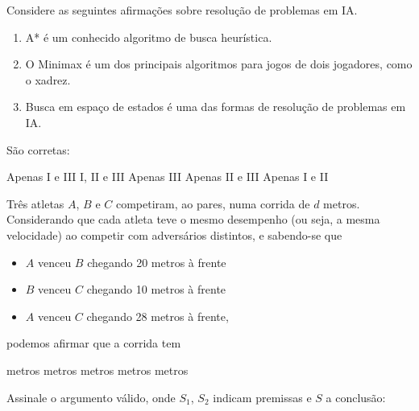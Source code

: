 \documentclass[12pt, addpoints]{exam}
\begin{document}
\begin{questions}
\question

Considere as seguintes afirmações sobre resolução de problemas em IA.

\begin{enumerate}[label=\Roman*.]

    \item A* é um conhecido algoritmo de busca heurística.

    \item O Minimax é um dos principais algoritmos para jogos de dois jogadores, como o xadrez.

    \item Busca em espaço de estados é uma das formas de resolução de problemas em IA.

\end{enumerate}

São corretas:
\begin{choices}
\choice Apenas I e III
\choice I, II e III
\choice Apenas III
\choice Apenas II e III
\choice Apenas I e II
\end{choices}

\question

Três atletas \( A \), \( B \) e \( C \) competiram, ao pares, numa corrida de \( d \) metros. Considerando que cada atleta teve o mesmo desempenho (ou seja, a mesma velocidade) ao competir com adversários distintos, e sabendo-se que



\begin{itemize}

    \item \( A \) venceu \( B \) chegando 20 metros à frente

    \item \( B \) venceu \( C \) chegando 10 metros à frente

    \item \( A \) venceu \( C \) chegando 28 metros à frente,

\end{itemize}



podemos afirmar que a corrida tem
\begin{choices}
 metros
 metros
 metros
 metros
 metros
\end{choices}

\question

Assinale o argumento válido, onde \( S_1 \), \( S_2 \) indicam premissas e \( S \) a conclusão:



\end{questions}
\end{document}

